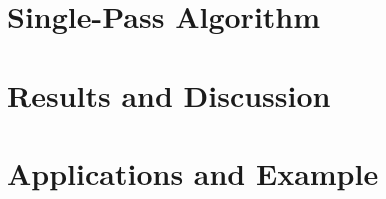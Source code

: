 \documentclass[11pt]{amsart}
\begin{document}
\section{Single-Pass Algorithm}
\section{Results and Discussion}
\section{Applications and Example}

\end{document}

